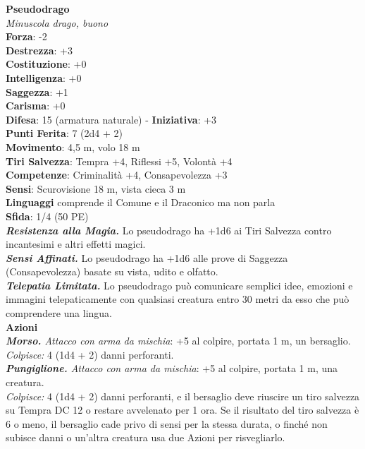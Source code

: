 \begin{multicols}{2}
\medskip\textbf{Pseudodrago}\\
\emph{Minuscola drago, buono}\\
\textbf{Forza}: -2\\
\textbf{Destrezza}: +3\\
\textbf{Costituzione}: +0\\
\textbf{Intelligenza}: +0\\
\textbf{Saggezza}: +1\\
\textbf{Carisma}: +0\\
\textbf{Difesa}: 15 (armatura naturale) - \textbf{Iniziativa}: +3\\
\textbf{Punti Ferita}: 7 (2d4 + 2)\\
\textbf{Movimento}: 4,5 m, volo 18 m\\
\textbf{Tiri Salvezza}: Tempra +4, Riflessi +5, Volontà +4\\
\textbf{Competenze}: Criminalità +4, Consapevolezza +3\\
\textbf{Sensi}: Scurovisione 18 m, vista cieca 3 m\\
\textbf{Linguaggi} comprende il Comune e il Draconico ma non parla\\
\textbf{Sfida}: 1/4 (50 PE)\smallskip\\
\emph{\textbf{Resistenza alla Magia.}} Lo pseudodrago ha +1d6 ai Tiri Salvezza contro incantesimi e altri effetti magici.\\
\emph{\textbf{Sensi Affinati.}} Lo pseudodrago ha +1d6 alle prove di Saggezza (Consapevolezza) basate su vista, udito e olfatto.\\
\emph{\textbf{Telepatia Limitata.}} Lo pseudodrago può comunicare semplici idee, emozioni e immagini telepaticamente con qualsiasi creatura entro 30 metri da esso che può comprendere una lingua. \\
\smallskip\textbf{Azioni}\\
\emph{\textbf{Morso.} Attacco con arma da mischia}: +5 al colpire, portata 1 m, un bersaglio.\\
\emph{Colpisce:} 4 (1d4 + 2) danni perforanti.\\
\emph{\textbf{Pungiglione.} Attacco con arma da mischia}: +5 al colpire, portata 1 m, una creatura.\\
\emph{Colpisce:} 4 (1d4 + 2) danni perforanti, e il bersaglio deve riuscire un tiro salvezza su Tempra DC  12 o restare avvelenato per 1 ora. Se il risultato del tiro salvezza è 6 o meno, il bersaglio cade privo di sensi per la stessa durata, o finché non subisce danni o un'altra creatura usa due Azioni per risvegliarlo.\\

\end{multicols}

